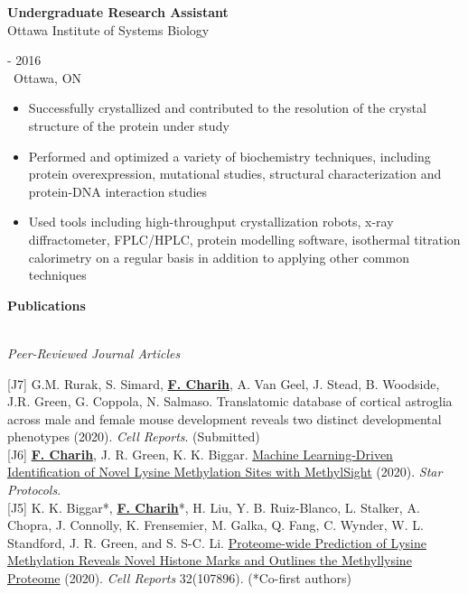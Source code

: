 \documentclass[11pt]{article}
\newcommand{\siteurl}[2]{{\href{#2}{\textcolor{quebecblue}{#1}}}}
\newcommand{\header}[1]{\begin{center}{\large \sc \bf #1}\end{center}\\}
\begin{document}
	\begin{minipage}[t]{0.8\textwidth}
		{\bf Undergraduate Research Assistant}\\
		Ottawa Institute of Systems Biology\\
	\end{minipage}
	\begin{minipage}[t]{0.2\textwidth}
		 - 2016\\
		\faMapMarker\ Ottawa, ON
	\end{minipage}
	\begin{itemize}[noitemsep,nolistsep]
			\item Successfully crystallized and contributed to the resolution of the crystal structure of the protein under study
			\item Performed and optimized a variety of biochemistry techniques, including protein overexpression, mutational studies, structural characterization and protein-DNA interaction studies
			\item Used tools including high-throughput crystallization robots, x-ray diffractometer, FPLC/HPLC, protein modelling software, isothermal titration calorimetry on a regular basis in addition to applying other common techniques
	\end{itemize}

	\vspace{\baselineskip}


\header{Publications}

\nopagebreak
\textit{Peer-Reviewed Journal Articles}\\

\nopagebreak

[J7] G.M. Rurak, S. Simard, \textbf{{\underline{{F. Charih}}}}, A. Van Geel, J. Stead, B. Woodside, J.R. Green, G. Coppola, N. Salmaso. Translatomic database of cortical astroglia across male and female mouse development reveals two distinct developmental phenotypes (2020). \textit{Cell Reports}. (Submitted)\\


[J6] \textbf{{\underline{{F. Charih}}}}, J. R. Green, K. K. Biggar. \siteurl{Machine Learning-Driven Identification of Novel Lysine Methylation Sites with MethylSight}{https://doi.org/10.1016/j.xpro.2020.100135} (2020). \textit{Star Protocols}. \\


[J5] K. K. Biggar*, \textbf{{\underline{{F. Charih}}}}*, H. Liu, Y. B. Ruiz-Blanco, L. Stalker, A. Chopra, J. Connolly, K. Frensemier, M. Galka, Q. Fang, C. Wynder, W. L. Standford, J. R. Green, and S. S-C. Li. \siteurl{Proteome-wide Prediction of Lysine Methylation Reveals Novel Histone Marks and Outlines the Methyllysine Proteome}{https://doi.org/10.1016/j.celrep.2020.107896} (2020). \textit{Cell Reports} 32(107896). (*Co-first authors)\\
\end{document}
